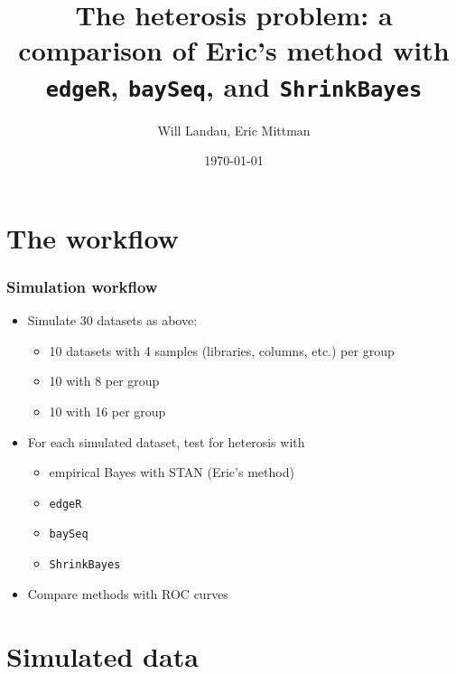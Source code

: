 \documentclass[handout]{beamer}
\title{The heterosis problem: a comparison of Eric's method with {\tt edgeR}, {\tt baySeq}, and {\tt ShrinkBayes}}
\author{Will Landau, Eric Mittman}
\date{\today}
\institute{Iowa State University}
\numberwithin{equation}{section}
\begin{document}
\begin{frame}
\titlepage
\end{frame}


\section{The workflow}

\begin{frame}
\frametitle{Simulation workflow}

\begin{itemize}
\item Simulate 30 datasets as above:
\begin{itemize}
\pause \item 10 datasets with 4 samples (libraries, columns, etc.) per group
\item 10 with 8 per group
\item 10 with 16 per group
\end{itemize}
\pause \item For each simulated dataset, test for heterosis with
\begin{itemize}
\item empirical Bayes with STAN (Eric's method)
\item {\tt edgeR} 
\item {\tt baySeq}
\item {\tt ShrinkBayes}
\end{itemize}
\item Compare methods with ROC curves
\end{itemize}
\end{frame}

\section{Simulated data}
\end{document}
